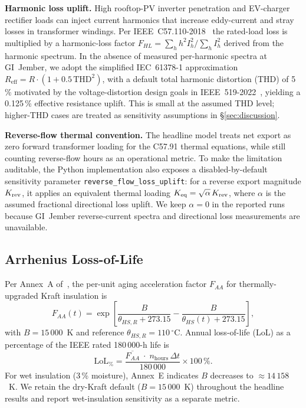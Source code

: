 \documentclass[conference]{IEEEtran}
\begin{document}
\textbf{Harmonic loss uplift.} High rooftop-PV inverter penetration and EV-charger rectifier loads can inject current harmonics that increase eddy-current and stray losses in transformer windings. Per IEEE~C57.110-2018~\cite{ieee_c57110_2018} the rated-load loss is multiplied by a harmonic-loss factor $F_{HL} = \sum_{h} h^{2} I_{h}^{2} / \sum_{h} I_{h}^{2}$ derived from the harmonic spectrum. In the absence of measured per-harmonic spectra at GI~Jember, we adopt the simplified IEC~61378-1 approximation $R_{\text{eff}} = R \cdot (1 + 0.5\,\text{THD}^{2})$, with a default total harmonic distortion (THD) of 5\,\% motivated by the voltage-distortion design goals in IEEE~519-2022~\cite{ieee_519_2022}, yielding a 0.125\,\% effective resistance uplift. This is small at the assumed THD level; higher-THD cases are treated as sensitivity assumptions in §\ref{sec:discussion}.

\textbf{Reverse-flow thermal convention.} The headline model treats net export as zero forward transformer loading for the C57.91 thermal equations, while still counting reverse-flow hours as an operational metric. To make the limitation auditable, the Python implementation also exposes a disabled-by-default sensitivity parameter \texttt{reverse\_flow\_loss\_uplift}: for a reverse export magnitude $K_{\rm rev}$, it applies an equivalent thermal loading $K_{\rm eq}=\sqrt{\alpha}\,K_{\rm rev}$, where $\alpha$ is the assumed fractional directional loss uplift. We keep $\alpha=0$ in the reported runs because GI~Jember reverse-current spectra and directional loss measurements are unavailable.

\subsection{Arrhenius Loss-of-Life}
Per Annex~A of~\cite{ieee_c5791_2011}, the per-unit aging acceleration factor $F_{AA}$ for thermally-upgraded Kraft insulation is
\begin{equation}
F_{AA}(t) = \exp\!\left[\frac{B}{\theta_{HS,R}+273.15} - \frac{B}{\theta_{HS}(t)+273.15}\right],
\end{equation}
with $B = 15\,000$~K and reference $\theta_{HS,R} = 110\,^\circ$C. Annual loss-of-life (LoL) as a percentage of the IEEE rated 180\,000-h life is
\begin{equation}
\text{LoL}_{\%} = \frac{\overline{F_{AA}}\;\cdot\;n_{\text{hours}}\,\Delta t}{180\,000}\times 100\,\%.
\end{equation}
For wet insulation (3\,\% moisture), Annex~E indicates $B$ decreases to $\approx 14\,158$~K. We retain the dry-Kraft default ($B = 15\,000$~K) throughout the headline results and report wet-insulation sensitivity as a separate metric.
\end{document}

